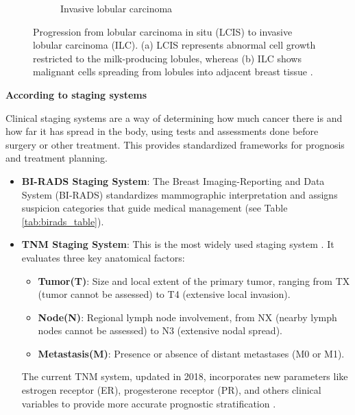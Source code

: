 \documentclass[a4paper,10pt]{book}
\begin{document}
\begin{figure}[h!]
\begin{subfigure}[c]{0.48\textwidth}
		\caption{Invasive lobular carcinoma}
		\label{fig:ilc}
	\end{subfigure}
	\caption{Progression from lobular carcinoma in situ (LCIS) to invasive lobular carcinoma (ILC). (a) LCIS represents abnormal cell growth restricted to the milk-producing lobules, whereas (b) ILC shows malignant cells spreading from lobules into adjacent breast tissue \cite{noauthor_nci_2011}.}
\label{fig:histological_types_two}
\end{figure}

\textbf{According to staging systems}

Clinical staging systems are a way of determining how much cancer there is and how far it has spread in the body, using tests and assessments done before surgery or other treatment. This provides standardized frameworks for prognosis and treatment planning.

\begin{itemize}
	\item \textbf{BI-RADS Staging System}: The Breast Imaging-Reporting and Data System (BI-RADS)\cite{magny_breast_2025} standardizes mammographic interpretation and assigns suspicion categories that guide medical management (see Table \ref{tab:birads_table}).
    \item  \textbf{TNM Staging System}: This is the most widely used staging system \cite{noauthor_stages_nodate}. It evaluates three key anatomical factors:
    \begin{itemize}
        \item \textbf{Tumor(T)}: Size and local extent of the primary tumor, ranging from TX (tumor cannot be assessed) to T4 (extensive local invasion).
        \item \textbf{Node(N)}: Regional lymph node involvement, from NX (nearby lymph nodes cannot be assessed) to N3 (extensive nodal spread).
        \item \textbf{Metastasis(M)}: Presence or absence of distant metastases (M0 or M1).
  \end{itemize}
  The current TNM system, updated in 2018, incorporates new parameters like estrogen receptor (ER), progesterone receptor (PR), and others clinical variables to provide more accurate prognostic stratification \cite{hortobagyi_new_2018}. 
  
\end{itemize}
\end{document}
